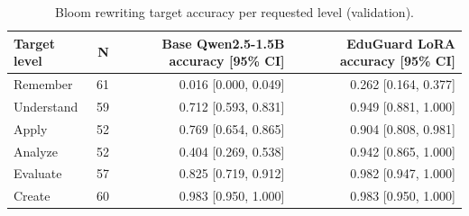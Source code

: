 \begin{table}[t]
\centering
\caption{Bloom rewriting target accuracy per requested level (validation).}
\label{tab:t4_bloom_per_level}
\begin{tabular}{lrrr}
\toprule
Target level & N & Base Qwen2.5-1.5B accuracy [95\% CI] & EduGuard LoRA accuracy [95\% CI] \\
\midrule
Remember & 61 & 0.016 [0.000, 0.049] & 0.262 [0.164, 0.377] \\
Understand & 59 & 0.712 [0.593, 0.831] & 0.949 [0.881, 1.000] \\
Apply & 52 & 0.769 [0.654, 0.865] & 0.904 [0.808, 0.981] \\
Analyze & 52 & 0.404 [0.269, 0.538] & 0.942 [0.865, 1.000] \\
Evaluate & 57 & 0.825 [0.719, 0.912] & 0.982 [0.947, 1.000] \\
Create & 60 & 0.983 [0.950, 1.000] & 0.983 [0.950, 1.000] \\
\bottomrule
\end{tabular}
\end{table}
